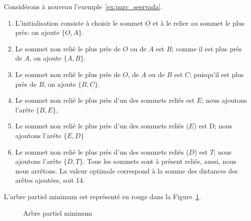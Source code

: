\begin{example}
Considérons à nouveau l'exemple~\ref{ex:parc_seervada}.
\begin{enumerate}
 \item 
L'initialisation consiste à choisir le sommet $O$ et à le relier au sommet le plus près: on ajoute $\lbrace O,A \rbrace$.
 \item
Le sommet non relié le plus près de $O$ ou de $A$ est $B$; comme il est plus près de $A$, on ajoute $\lbrace A,B \rbrace$.
 \item
Le sommet non relié le plus près de $O$, de $A$ ou de $B$ est $C$; puisqu'il est plus près de $B$, on ajoute $\lbrace B,C \rbrace$.
 \item
Le sommet non relié le plus près d'un des sommets reliés est $E$; nous ajoutons l'arête $\lbrace B,E \rbrace$,
 \item
Le sommet non relié le plus près d'un des sommets reliés ($E$) est D; nous ajoutons l'arête $\lbrace E,D \rbrace$
 \item
Le sommet non relié le plus près d'un des sommets reliés ($D$) est $T$; nous ajoutons l'arête $\lbrace D,T \rbrace$.
Tous les sommets sont à présent reliés, aussi, nous nous arrêtons.
La valeur optimale correspond à la somme des distances des arêtes ajoutées, soit 14.
\end{enumerate}
L'arbre partiel minimum est représenté en rouge dans la Figure~\ref{fig:prim}.

\begin{figure}[htbp]
\begin{center}
\caption{Arbre partiel minimum}
\label{fig:prim}
\end{center}
\end{figure}
\end{example}

